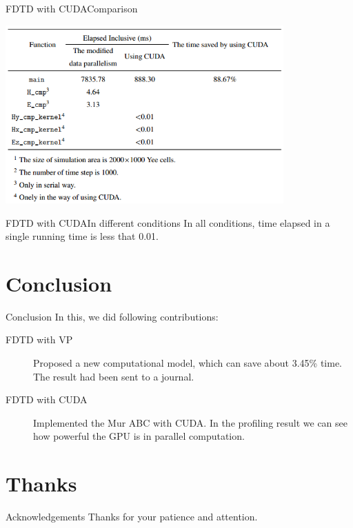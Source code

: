 \documentclass[11pt]{beamer}
\begin{document}
	\begin{frame}{FDTD with CUDA}{Comparison}
		\begin{table}
			\includegraphics[width=0.8\textwidth]{cuda}
			\caption{The comparison between the modified data parallelism and using CUDA}
		\end{table}
	\end{frame}
	
	\begin{frame}{FDTD with CUDA}{In different conditions}
		In all conditions, time elapsed in a single running time is less that 0.01.
	\end{frame}
	
	\section{Conclusion}
	\begin{frame}{Conclusion}
		In this, we did following contributions:
		\begin{description}
			\item[FDTD with VP] Proposed a new computational model, which can save about 3.45\% time. The result had been sent to a journal.
			\item[FDTD with CUDA] Implemented the Mur ABC with CUDA. In the profiling result we can see how powerful the GPU is in parallel computation.
		\end{description}
	\end{frame}
	
	\section{Thanks}
	\begin{frame}{Acknowledgements}
		Thanks for your patience and attention.
	\end{frame}
\end{document}
